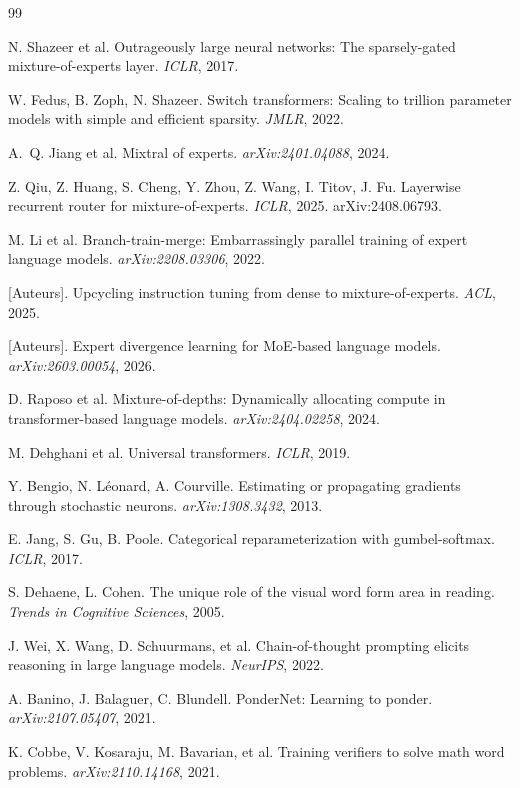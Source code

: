 \documentclass[10pt,a4paper]{article}
\begin{document}

\begin{thebibliography}{99}

N. Shazeer et al.
\newblock Outrageously large neural networks: The sparsely-gated mixture-of-experts layer.
\newblock \textit{ICLR}, 2017.

W. Fedus, B. Zoph, N. Shazeer.
\newblock Switch transformers: Scaling to trillion parameter models with simple and efficient sparsity.
\newblock \textit{JMLR}, 2022.

A.~Q. Jiang et al.
\newblock Mixtral of experts.
\newblock \textit{arXiv:2401.04088}, 2024.

Z. Qiu, Z. Huang, S. Cheng, Y. Zhou, Z. Wang, I. Titov, J. Fu.
\newblock Layerwise recurrent router for mixture-of-experts.
\newblock \textit{ICLR}, 2025. arXiv:2408.06793.

M. Li et al.
\newblock Branch-train-merge: Embarrassingly parallel training of expert language models.
\newblock \textit{arXiv:2208.03306}, 2022.

[Auteurs].
\newblock Upcycling instruction tuning from dense to mixture-of-experts.
\newblock \textit{ACL}, 2025.

[Auteurs].
\newblock Expert divergence learning for MoE-based language models.
\newblock \textit{arXiv:2603.00054}, 2026.

D. Raposo et al.
\newblock Mixture-of-depths: Dynamically allocating compute in transformer-based language models.
\newblock \textit{arXiv:2404.02258}, 2024.

M. Dehghani et al.
\newblock Universal transformers.
\newblock \textit{ICLR}, 2019.

Y. Bengio, N. Léonard, A. Courville.
\newblock Estimating or propagating gradients through stochastic neurons.
\newblock \textit{arXiv:1308.3432}, 2013.

E. Jang, S. Gu, B. Poole.
\newblock Categorical reparameterization with gumbel-softmax.
\newblock \textit{ICLR}, 2017.

S. Dehaene, L. Cohen.
\newblock The unique role of the visual word form area in reading.
\newblock \textit{Trends in Cognitive Sciences}, 2005.

J. Wei, X. Wang, D. Schuurmans, et al.
\newblock Chain-of-thought prompting elicits reasoning in large language models.
\newblock \textit{NeurIPS}, 2022.

A. Banino, J. Balaguer, C. Blundell.
\newblock PonderNet: Learning to ponder.
\newblock \textit{arXiv:2107.05407}, 2021.

K. Cobbe, V. Kosaraju, M. Bavarian, et al.
\newblock Training verifiers to solve math word problems.
\newblock \textit{arXiv:2110.14168}, 2021.

\end{thebibliography}
\end{document}
